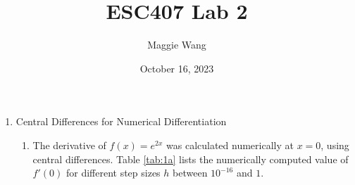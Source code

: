 \documentclass{article}
\begin{document}
\title{ESC407 Lab 2}

\author{Maggie Wang}

\date{October 16, 2023}
\maketitle

\begin{enumerate}
\item Central Differences for Numerical Differentiation
\begin{enumerate}
    \item The derivative of $f(x)=e^{2x}$ was calculated numerically at $x=0$, using central differences. 
    Table \ref{tab:1a} lists the numerically computed value of $f'(0)$ for different step sizes $h$ between $10^{-16}$ and $1$.
    


\end{enumerate}
\end{enumerate}
\end{document}
